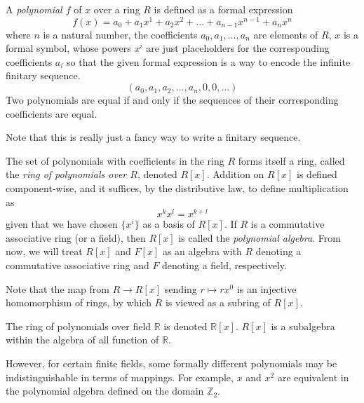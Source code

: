 \documentclass{article}
\begin{document}
      \begin{definition}
        A \textit{polynomial $f$} of $x$ over a ring $R$ is defined as a formal expression 
        \begin{equation}
          f(x) = a_0 + a_1 x^1 + a_2 x^2 + ...  + a_{n-1} x^{n-1} + a_n x^n
        \end{equation}
        where $n$ is a natural number, the coefficients $a_0, a_1, ..., a_n$ are elements of $R$, $x$ is a formal symbol, whose powers $x^i$ are just placeholders for the corresponding coefficients $a_i$ so that the given formal expression is a way to encode the infinite finitary sequence. 
        \begin{equation}
          (a_0, a_1, a_2, ..., a_n, 0, 0, ...)
        \end{equation}
        Two polynomials are equal if and only if the sequences of their corresponding coefficients are equal.
      \end{definition}

      Note that this is really just a fancy way to write a finitary sequence. 

      \begin{definition}
        The set of polynomials with coefficients in the ring $R$ forms itself a ring, called the \textit{ring of polynomials over $R$}, denoted $R[x]$. Addition on $R[x]$ is defined component-wise, and it suffices, by the distributive law, to define multiplication as
        \begin{equation}
          x^k x^l = x^{k + l}
        \end{equation}
        given that we have chosen $\{x^i\}$ as a basis of $R[x]$. If $R$ is a commutative associative ring (or a field), then $R[x]$ is called the \textit{polynomial algebra}. From now, we will treat $R[x]$ and $F[x]$ as an algebra with $R$ denoting a commutative associative ring and $F$ denoting a field, respectively. 
      \end{definition}

      Note that the map from $R \longrightarrow R[x]$ sending $r \mapsto r x^0$ is an injective homomorphism of rings, by which $R$ is viewed as a subring of $R[x]$. 

      The ring of polynomials over field $\mathbb{R}$ is denoted $\mathbb{R}[x]$. $R[x]$ is a subalgebra within the algebra of all function of $\mathbb{R}$. 

      However, for certain finite fields, some formally different polynomials may be indistinguishable in terms of mappings. For example, $x$ and $x^2$ are equivalent in the polynomial algebra defined on the domain $\mathbb{Z}_2$.
\end{document}
